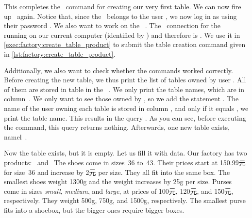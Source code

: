 %
%
%
%
%
This completes the \sql\ command for creating our very first table.
We can now fire up \psql\ again.
Notice that, since the \db\ belongs to the user , we now log in as  using their password .
We also want to work on the \db\ .
The \postgresql\ connection  for the \db\  running on our current computer (identified by \localhost) and therefore is .
We use it in \cref{exec:factory:create_table_product} to submit the table creation command given in \cref{lst:factory:create_table_product}.%
%
\begin{sloppypar}%
Additionally, we also want to check whether the commands worked correctly.
Before creating the new table, we thus print the list of tables owned by user .
All of them are stored in table  in the \postgresql\ .
We only print the table names, which are in column~.
We only want to see those owned by , so we add the statement .
The name of the user owning each table is stored in column , and only if it equals , we print the table name.
This results in the query .
As you can see, before executing the  command, this query returns nothing.
Afterwards, one new table exists, namel~.%
\end{sloppypar}%
\FloatBarrier%
\endhsection%
%
\afterpage{\clearpage}%
%
%
Now the table  exists, but it is empty.
Let us fill it with data.
Our factory has two products:~ and~
The shoes come in sizes~36 to~43.
Their prices start at 150.99元 for size~36 and increase by 2元 per size.
They all fit into the same box.
The smallest shoes weight 1300g and the weight increases by 25g per size.
Purses come in sizes \emph{small}, \emph{medium}, and \emph{large}, at prices of 100元, 120元, and 150元, respectively.
They weight 500g, 750g, and 1500g, respectively.
The smallest purse fits into a shoebox, but the bigger ones require bigger boxes.

